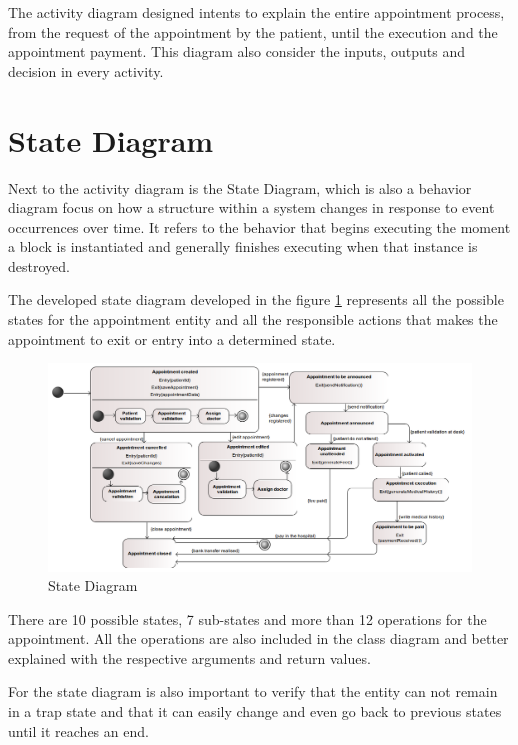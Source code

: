 \documentclass{article}
\begin{document}
            The activity diagram designed intents to explain the entire appointment process, from the request of the appointment by the patient, until the execution and the appointment payment. This 
            diagram also consider the inputs, outputs and decision in every activity.

            \section{State Diagram}
           
            Next to the activity diagram is the State Diagram, which is also a behavior
            diagram focus on how a structure within a system changes in response to event
            occurrences over time. It refers to the behavior that begins executing the moment a block
            is instantiated and generally finishes executing when that instance is destroyed.
            
            The developed state diagram developed in the figure \ref{fig:state} represents all the possible states for the appointment entity and all the responsible actions that makes the appointment to exit or entry into a 
            determined state.

            \begin{figure}[H]
                \centering 
                \includegraphics[width=.8\linewidth]{./img/state.png}
                \caption{State Diagram}
                \label{fig:state}
            \end{figure}
            
            There are 10 possible states, 7 sub-states and more than 12 operations for the appointment. All the operations are also included in the class diagram and  better explained with the respective arguments and return values.
            
            For the state diagram is also important to verify that the entity can not remain in a trap state and that it can easily change and even go back to previous states until it reaches
            an end.
            
\end{document}
